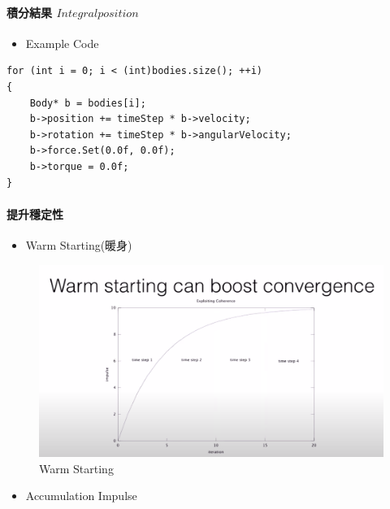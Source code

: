 \paragraph{積分結果 \(Integral position\)}

\begin{itemize}
    \item{Example Code}
\end{itemize}

\begin{lstlisting}  
for (int i = 0; i < (int)bodies.size(); ++i)
{
    Body* b = bodies[i];
    b->position += timeStep * b->velocity;
    b->rotation += timeStep * b->angularVelocity;
    b->force.Set(0.0f, 0.0f);
    b->torque = 0.0f;
}
\end{lstlisting}

\paragraph{提升穩定性}

\begin{itemize}
\item{Warm Starting(暖身)}
\end{itemize}

\begin{figure}[h]
    \begin{center}
        \includegraphics[width=0.8\linewidth]{./resources/physics/warm.png}
    \end{center}
    \caption{Warm Starting}
    \label{Warm_Starting}
\end{figure}

\begin{itemize}
    \item{Accumulation Impulse}
\end{itemize}

